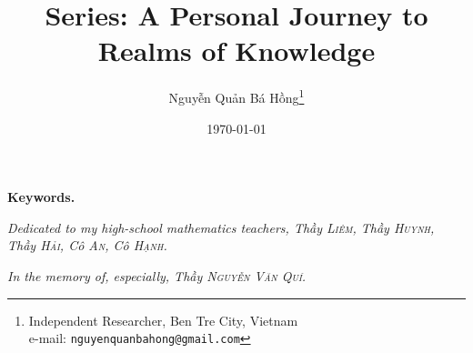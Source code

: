 \documentclass{article}
\title{Series: A Personal Journey to Realms of Knowledge}
\author{\selectlanguage{vietnamese} Nguyễn Quản Bá Hồng\footnote{Independent Researcher, Ben Tre City, Vietnam\\e-mail: \texttt{nguyenquanbahong@gmail.com}}}
\date{\today}
\numberwithin{equation}{section}
\begin{document}
\maketitle
\begin{abstract}
	
\end{abstract}

\textbf{Keywords.}
\tableofcontents
\vspace{5mm}



\begin{center}
	\textit{Dedicated to my high-school mathematics teachers, Thầy \textsc{Liêm}, Thầy \textsc{Huynh}, Thầy \textsc{Hải}, Cô \textsc{An}, Cô \textsc{Hạnh}.}
	
	\textit{In the memory of, especially, Thầy \textsc{Nguyễn Văn Quí}.}
\end{center}
\end{document}
